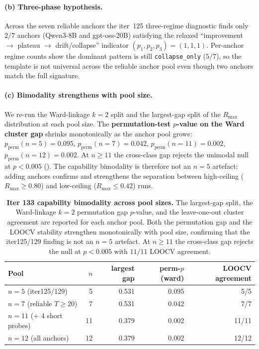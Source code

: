 \paragraph{(b) Three-phase hypothesis.}
\label{par:scaling-iter133-tp}
Across the seven reliable anchors the iter~125 three-regime
diagnostic finds only $2/7$ anchors (Qwen3-8B and gpt-oss-20B)
satisfying the relaxed ``improvement $\to$ plateau
$\to$ drift/collapse'' indicator $(p_1, p_2, p_3) = (1, 1, 1)$.
Per-anchor regime counts show the dominant pattern is still
\texttt{collapse\_only} ($5/7$), so the template is
not universal across the reliable anchor pool even though two anchors
match the full signature.

\paragraph{(c) Bimodality strengthens with pool size.}
\label{par:scaling-iter133-bimod}
We re-run the Ward-linkage $k=2$ split and the largest-gap split
of the $R_{\max}$ distribution at each pool size.  The
\textbf{permutation-test $p$-value on the Ward cluster gap}
shrinks monotonically as the anchor pool grows:
$p_{\text{perm}}(n=5) = 0.095$,
$p_{\text{perm}}(n=7) = 0.042$,
$p_{\text{perm}}(n=11) = 0.002$,
$p_{\text{perm}}(n=12) = 0.002$.
At $n \ge 11$ the cross-class gap rejects the unimodal null at
$p < 0.005$ ().  The capability
bimodality is therefore not an $n = 5$ artefact: adding anchors
confirms and strengthens the separation between high-ceiling
($R_{\max} \ge 0.80$) and low-ceiling ($R_{\max} \le 0.42$) runs.

\begin{table}[t]
  \centering
  \small
  \begin{tabular}{lrrrr}
    \toprule
    Pool & $n$ & largest gap & perm-$p$(ward) & LOOCV agreement \\
    \midrule
    $n=5$ (iter125/129)        &  5 & 0.531 & 0.095 & 5/5   \\
    $n=7$ (reliable $T \ge 20$)&  7 & 0.531 & 0.042 & 7/7   \\
    $n=11$ (+ 4 short probes)  & 11 & 0.379 & 0.002 & 11/11 \\
    $n=12$ (all anchors)       & 12 & 0.379 & 0.002 & 12/12 \\
    \bottomrule
  \end{tabular}
  \caption{\textbf{Iter 133 capability bimodality across pool sizes.}
    The largest-gap split, the Ward-linkage $k=2$ permutation gap
    $p$-value, and the leave-one-out cluster agreement are reported
    for each anchor pool.  Both the permutation gap and the LOOCV
    stability strengthen monotonically with pool size, confirming
    that the iter125/129 finding is not an $n = 5$ artefact.  At
    $n \ge 11$ the cross-class gap rejects the null at $p < 0.005$
    with $11/11$ LOOCV agreement.}
  \label{tab:scaling-iter133-bimod}
\end{table}

